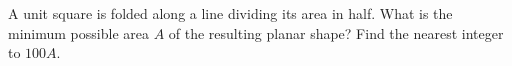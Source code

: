 A unit square is folded along a line dividing its area in half. What is the minimum possible area $A$ of the resulting planar shape? Find the nearest integer to $100A$.
